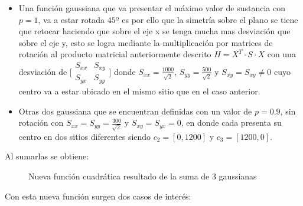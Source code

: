 \begin{itemize}
	\item Una función gaussiana que va presentar el máximo valor de sustancia con $p=1$, va a estar rotada $45º$ es por ello que la simetría sobre el plano se tiene que retocar haciendo que sobre el eje x se tenga mucha mas desviación que sobre el eje y, esto se logra mediante la multiplicación por matrices de rotación al producto matricial anteriormente descrito $H=X^{T}\cdot{S}\cdot{X}$ con una desviación de $\bigl[\begin{smallmatrix}S_{xx} & S_{xy}\\ S_{yx} & S_{yy}\end{smallmatrix}\bigr]$ donde $S_{xx}=\frac{1000}{\sqrt{2}}$, $S_{yy}=\frac{500}{\sqrt{2}}$ y $S_{xy}=S_{xy}\neq{0}$ cuyo centro va a estar ubicado en el mismo sitio que en el caso anterior.
	\item Otras dos gaussiana que se encuentran definidas con un valor de $p=0.9$, sin rotación con $S_{xx}=S_{yy}={\frac{300}{\sqrt{2}}}$ y $S_{xy}=S_{yx}={0}$, en donde cada presenta su centro en dos sitios diferentes siendo $c_{2}=[0,1200]$ y $c_{3}=[1200,0]$.
\end{itemize}

Al sumarlas se obtiene:

\begin{figure}[H]
  \begin{center}
    \caption{Nueva función cuadrática resultado de la suma de 3 gaussianas}
    \label{New_Gaussiana}
  \end{center}
\end{figure}
\newpage
Con esta nueva función surgen dos casos de interés:

